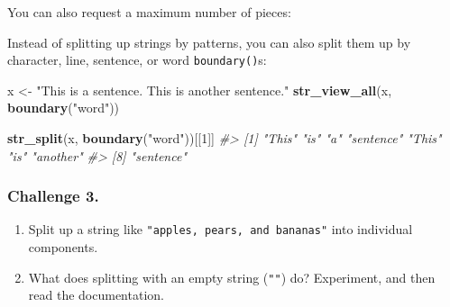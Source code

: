 \documentclass[]{book}
\newenvironment{Shaded}{\begin{snugshade}}{\end{snugshade}}
\newcommand{\KeywordTok}[1]{\textcolor[rgb]{0.13,0.29,0.53}{\textbf{#1}}}
\newcommand{\DataTypeTok}[1]{\textcolor[rgb]{0.13,0.29,0.53}{#1}}
\newcommand{\DecValTok}[1]{\textcolor[rgb]{0.00,0.00,0.81}{#1}}
\newcommand{\StringTok}[1]{\textcolor[rgb]{0.31,0.60,0.02}{#1}}
\newcommand{\CommentTok}[1]{\textcolor[rgb]{0.56,0.35,0.01}{\textit{#1}}}
\newcommand{\OtherTok}[1]{\textcolor[rgb]{0.56,0.35,0.01}{#1}}
\newcommand{\OperatorTok}[1]{\textcolor[rgb]{0.81,0.36,0.00}{\textbf{#1}}}
\newcommand{\NormalTok}[1]{#1}
\begin{document}
You can also request a maximum number of pieces:

\begin{Shaded}
\end{Shaded}

Instead of splitting up strings by patterns, you can also split them up
by character, line, sentence, or word \texttt{boundary()}s:

\begin{Shaded}
\begin{Highlighting}[]
\NormalTok{x <-}\StringTok{ "This is a sentence.  This is another sentence."}
\KeywordTok{str_view_all}\NormalTok{(x, }\KeywordTok{boundary}\NormalTok{(}\StringTok{"word"}\NormalTok{))}
\end{Highlighting}
\end{Shaded}

\hypertarget{htmlwidget-21c7483268bafca56cec}{}

\begin{Shaded}
\begin{Highlighting}[]
\KeywordTok{str_split}\NormalTok{(x, }\KeywordTok{boundary}\NormalTok{(}\StringTok{"word"}\NormalTok{))[[}\DecValTok{1}\NormalTok{]]}
\CommentTok{#> [1] "This"     "is"       "a"        "sentence" "This"     "is"       "another" }
\CommentTok{#> [8] "sentence"}
\end{Highlighting}
\end{Shaded}

\subsubsection*{Challenge 3.}\label{challenge-3.-8}

\begin{enumerate}
\def\labelenumi{\arabic{enumi}.}
\item
  Split up a string like \texttt{"apples,\ pears,\ and\ bananas"} into
  individual components.
\item
  What does splitting with an empty string (\texttt{""}) do? Experiment,
  and then read the documentation.
\end{enumerate}
\end{document}

